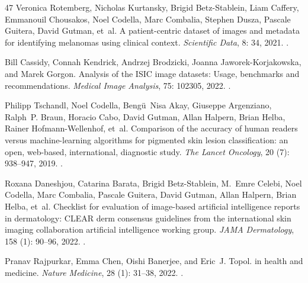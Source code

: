 \documentclass[11pt]{article}
\begin{document}
\begin{thebibliography}{47}
Veronica Rotemberg, Nicholas Kurtansky, Brigid Betz-Stablein, Liam Caffery,
  Emmanouil Chousakos, Noel Codella, Marc Combalia, Stephen Dusza, Pascale
  Guitera, David Gutman, et~al.
\newblock A patient-centric dataset of images and metadata for identifying
  melanomas using clinical context.
\newblock \emph{Scientific Data}, 8: 34, 2021.
\newblock {}.

Bill Cassidy, Connah Kendrick, Andrzej Brodzicki, Joanna Jaworek-Korjakowska,
  and Marek Gorgon.
\newblock Analysis of the {ISIC} image datasets: Usage, benchmarks and
  recommendations.
\newblock \emph{Medical Image Analysis}, 75: 102305, 2022.
\newblock {}.

Philipp Tschandl, Noel Codella, Beng{\"u}~Nisa Akay, Giuseppe Argenziano,
  Ralph~P. Braun, Horacio Cabo, David Gutman, Allan Halpern, Brian Helba,
  Rainer Hofmann-Wellenhof, et~al.
\newblock Comparison of the accuracy of human readers versus machine-learning
  algorithms for pigmented skin lesion classification: an open, web-based,
  international, diagnostic study.
\newblock \emph{The Lancet Oncology}, 20 (7): 938--947, 2019.
\newblock {}.

Roxana Daneshjou, Catarina Barata, Brigid Betz-Stablein, M.~Emre Celebi, Noel
  Codella, Marc Combalia, Pascale Guitera, David Gutman, Allan Halpern, Brian
  Helba, et~al.
\newblock Checklist for evaluation of image-based artificial intelligence
  reports in dermatology: {CLEAR} derm consensus guidelines from the
  international skin imaging collaboration artificial intelligence working
  group.
\newblock \emph{JAMA Dermatology}, 158 (1): 90--96,
  2022{}.
\newblock {}.

Pranav Rajpurkar, Emma Chen, Oishi Banerjee, and Eric~J. Topol.
 in health and medicine.
\newblock \emph{Nature Medicine}, 28 (1): 31--38, 2022.
\newblock {}.


\end{thebibliography}
\end{document}
